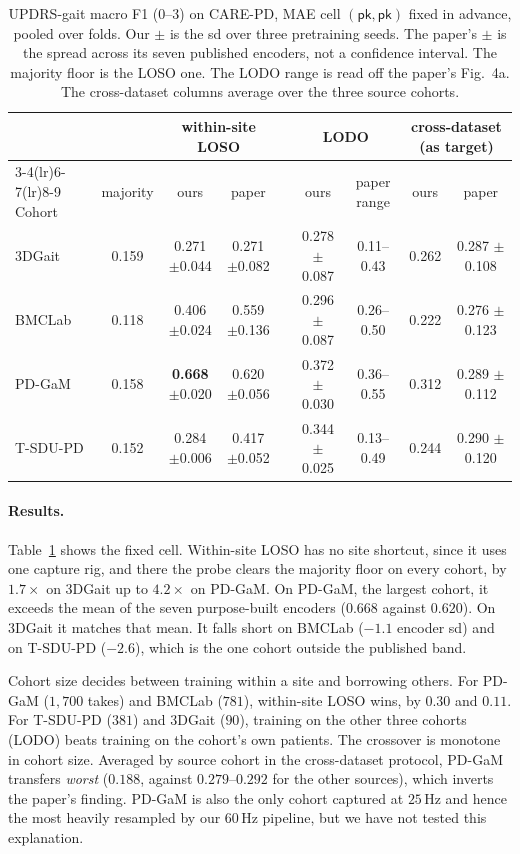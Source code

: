\begin{table}[t]
\centering
\small
\begin{tabular}{lcccccccc}
\toprule
& & \multicolumn{2}{c}{within-site LOSO} & & \multicolumn{2}{c}{LODO} & \multicolumn{2}{c}{cross-dataset (as target)} \\
\cmidrule(lr){3-4}\cmidrule(lr){6-7}\cmidrule(lr){8-9}
Cohort & majority & ours & paper & & ours & paper range & ours & paper \\
\midrule
3DGait   & 0.159 & 0.271 $\pm$0.044 & 0.271 $\pm$0.082 & & 0.278 $\pm$0.087 & 0.11--0.43 & 0.262 & 0.287 $\pm$0.108 \\
BMCLab   & 0.118 & 0.406 $\pm$0.024 & 0.559 $\pm$0.136 & & 0.296 $\pm$0.087 & 0.26--0.50 & 0.222 & 0.276 $\pm$0.123 \\
PD-GaM   & 0.158 & \textbf{0.668} $\pm$0.020 & 0.620 $\pm$0.056 & & 0.372 $\pm$0.030 & 0.36--0.55 & 0.312 & 0.289 $\pm$0.112 \\
T-SDU-PD & 0.152 & 0.284 $\pm$0.006 & 0.417 $\pm$0.052 & & 0.344 $\pm$0.025 & 0.13--0.49 & 0.244 & 0.290 $\pm$0.120 \\
\bottomrule
\end{tabular}
\caption{UPDRS-gait macro F1 ($0$--$3$) on CARE-PD, MAE cell $(\textsf{pk},\textsf{pk})$
fixed in advance, pooled over folds. Our $\pm$ is the sd over three pretraining seeds. The
paper's $\pm$ is the spread across its seven published encoders, not a confidence interval.
The majority floor is the LOSO one. The LODO range is read off the paper's Fig.~4a. The
cross-dataset columns average over the three source cohorts.}
\label{tab:exp-carepd}
\end{table}

\paragraph{Results.} Table~\ref{tab:exp-carepd} shows the fixed cell. Within-site LOSO has
no site shortcut, since it uses one capture rig, and there the probe clears the majority
floor on every cohort, by $1.7\times$ on 3DGait up to $4.2\times$ on PD-GaM. On PD-GaM,
the largest cohort, it exceeds the mean of the seven purpose-built encoders ($0.668$ against
$0.620$). On 3DGait it matches that mean. It falls short on BMCLab ($-1.1$ encoder sd) and
on T-SDU-PD ($-2.6$), which is the one cohort outside the published band.

Cohort size decides between training within a site and borrowing others. For PD-GaM
($1{,}700$ takes) and BMCLab ($781$), within-site LOSO wins, by $0.30$ and $0.11$. For
T-SDU-PD ($381$) and 3DGait ($90$), training on the other three cohorts (LODO) beats
training on the cohort's own patients. The crossover is monotone in cohort size. Averaged
by source cohort in the cross-dataset protocol, PD-GaM transfers \emph{worst} ($0.188$,
against $0.279$--$0.292$ for the other sources), which inverts the paper's finding. PD-GaM
is also the only cohort captured at $25$\,Hz and hence the most heavily resampled by our
$60$\,Hz pipeline, but we have not tested this explanation.


